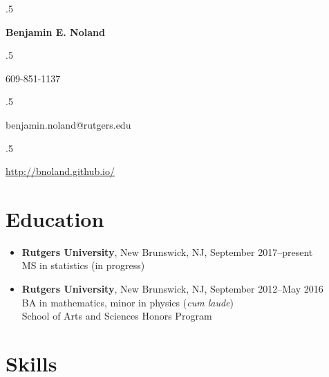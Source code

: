 \documentclass[letterpaper,12pt]{article}
\begin{document}
\moveleft.5\hoffset\centerline{\Large\bf Benjamin E. Noland}
\smallskip
\moveleft.5\hoffset\centerline{609-851-1137}
\moveleft.5\hoffset\centerline{benjamin.noland@rutgers.edu}
\moveleft.5\hoffset\centerline{\url{http://bnoland.github.io/}}

\section*{Education}

\begin{itemize}
\item
\textbf{Rutgers University}, New Brunswick, NJ, September 2017--present \\
MS in statistics (in progress)

\item
\textbf{Rutgers University}, New Brunswick, NJ, September 2012--May 2016 \\
BA in mathematics, minor in physics (\textit{cum laude}) \\
School of Arts and Sciences Honors Program
\end{itemize}
\iffalse
\subsection*{Selection of coursework:}
\begin{itemize}
\item
\textbf{Mathematics:} Calculus, linear algebra, ordinary differential equations, real analysis, 
complex variables, differential geometry, linear programming, abstract algebra, topology 
\textit{(taken at Rutgers University)}

\item
\textbf{Physics:}
Classical mechanics, electromagnetism, astrophysics \textit{(taken at Rutgers University)}

\item
\textbf{Computer science:}
Systems programming, data structures and algorithms \textit{(taken at Princeton University while in 
high school)}; Advanced Placement computer science \textit{(taken in high school)}

\item
\textbf{Statistics:} Advanced Placement statistics \textit{(taken in high school)}, probability 
theory, regression analysis \textit{(taking at Rutgers University)}

\end{itemize}
\fi
\section*{Skills}
\end{document}
